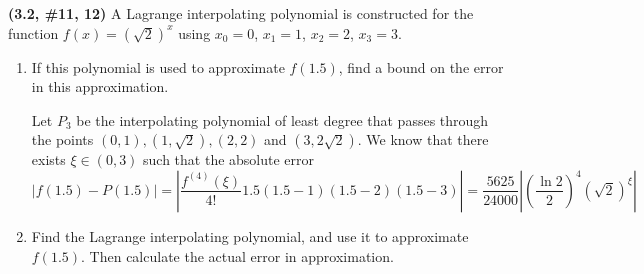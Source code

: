\documentclass{eh-homework}
\begin{document}
    \begin{question}{6}
    \textbf{(3.2, \#11, 12)} A Lagrange interpolating polynomial is constructed for the function \(f(x) = (\sqrt{2})^x\) using \(x_0 = 0\), \(x_1 = 1\), \(x_2 = 2\), \(x_3 = 3\).
    
    \begin{enumerate}[label=\alph*.]
        \item If this polynomial is used to approximate \(f(1.5)\), find a bound on the error in this approximation.
        
        Let \(P_3\) be the interpolating polynomial of least degree that passes through the points \((0, 1), (1, \sqrt{2}), (2,2)\) and \((3, 2\sqrt{2})\). We know that there exists \(\xi \in (0,3)\) such that the absolute error
        \[
            |f(1.5) - P(1.5)| = \left\vert \frac{f^{(4)}(\xi)}{4!} 1.5(1.5-1)(1.5-2)(1.5-3) \right\vert = \frac{5625}{24000}\left\vert \left(\frac{\ln 2}{2}\right)^4(\sqrt{2})^{\xi} \right\vert 
        \]
    
        \item Find the Lagrange interpolating polynomial, and use it to approximate \(f(1.5)\). Then calculate the actual error in approximation.
    \end{enumerate}
    \end{question}
\end{document}
